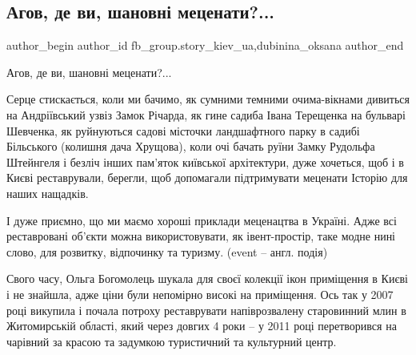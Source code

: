  
 
 
 
 
 
\subsection{Агов, де ви, шановні меценати?...}
\label{sec:20_02_2022.fb.fb_group.story_kiev_ua.1.mecenaty}
 
\ifcmt
 author_begin
   author_id fb_group.story_kiev_ua,dubinina_oksana
 author_end
\fi

Агов, де ви, шановні меценати?...

Серце стискається, коли ми бачимо, як сумними темними очима-вікнами дивиться на
Андріївський узвіз Замок Річарда, як гине садиба Івана Терещенка на бульварі
Шевченка, як руйнуються садові місточки ландшафтного парку в садибі Більського
(колишня дача Хрущова), коли очі бачать руїни Замку Рудольфа Штейнгеля і безліч
інших пам’яток київської архітектури, дуже хочеться, щоб і в Києві
реставрували, берегли, щоб допомагали підтримувати  меценати Історію для наших
нащадків. 


І дуже приємно, що ми маємо хороші приклади меценацтва в Україні. Адже всі
реставровані об’єкти можна використовувати, як івент-простір, таке модне нині
слово, для розвитку, відпочинку та туризму. (event – англ. подія)


Свого часу, Ольга Богомолець шукала для своєї колекції ікон приміщення в Києві
і не знайшла, адже ціни були непомірно високі на приміщення. Ось так у 2007
році викупила і почала потроху реставрувати напіврозвалену старовинний млин в
Житомирській області, який через довгих 4 роки – у 2011 році перетворився на
чарівний за красою та задумкою туристичний та культурний центр.


